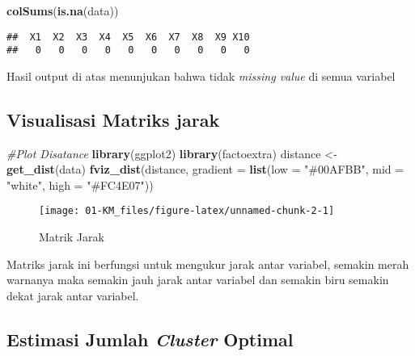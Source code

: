 \documentclass[
]{elegantbook}
\newenvironment{Shaded}{\begin{snugshade}}{\end{snugshade}}
\newcommand{\AttributeTok}[1]{\textcolor[rgb]{0.13,0.29,0.53}{#1}}
\newcommand{\CommentTok}[1]{\textcolor[rgb]{0.56,0.35,0.01}{\textit{#1}}}
\newcommand{\FunctionTok}[1]{\textcolor[rgb]{0.13,0.29,0.53}{\textbf{#1}}}
\newcommand{\NormalTok}[1]{#1}
\newcommand{\OtherTok}[1]{\textcolor[rgb]{0.56,0.35,0.01}{#1}}
\newcommand{\StringTok}[1]{\textcolor[rgb]{0.31,0.60,0.02}{#1}}
\begin{document}
\begin{Shaded}
\begin{Highlighting}[]
\FunctionTok{colSums}\NormalTok{(}\FunctionTok{is.na}\NormalTok{(data))}
\end{Highlighting}
\end{Shaded}

\begin{verbatim}
##  X1  X2  X3  X4  X5  X6  X7  X8  X9 X10 
##   0   0   0   0   0   0   0   0   0   0
\end{verbatim}

Hasil output di atas menunjukan bahwa tidak \emph{missing value} di semua variabel

\hypertarget{visualisasi-matriks-jarak}{%
\subsection{Visualisasi Matriks jarak}\label{visualisasi-matriks-jarak}}

\begin{Shaded}
\begin{Highlighting}[]
\CommentTok{\#Plot Disatance}
\FunctionTok{library}\NormalTok{(ggplot2)}
\FunctionTok{library}\NormalTok{(factoextra)}
\NormalTok{distance }\OtherTok{\textless{}{-}} \FunctionTok{get\_dist}\NormalTok{(data)}
\FunctionTok{fviz\_dist}\NormalTok{(distance, }\AttributeTok{gradient =} \FunctionTok{list}\NormalTok{(}\AttributeTok{low =} \StringTok{"\#00AFBB"}\NormalTok{, }\AttributeTok{mid =} \StringTok{"white"}\NormalTok{, }\AttributeTok{high =} \StringTok{"\#FC4E07"}\NormalTok{))}
\end{Highlighting}
\end{Shaded}

\begin{figure}

{\centering \texttt{[image: 01-KM\_files/figure-latex/unnamed-chunk-2-1]} 

}

\caption{Matrik Jarak}\label{fig:unnamed-chunk-2}
\end{figure}

Matriks jarak ini berfungsi untuk mengukur jarak antar variabel, semakin merah warnanya maka semakin jauh jarak antar variabel dan semakin biru semakin dekat jarak antar variabel.

\hypertarget{estimasi-jumlah-cluster-optimal}{%
\subsection{\texorpdfstring{Estimasi Jumlah \emph{Cluster} Optimal}{Estimasi Jumlah Cluster Optimal}}\label{estimasi-jumlah-cluster-optimal}}
\end{document}
